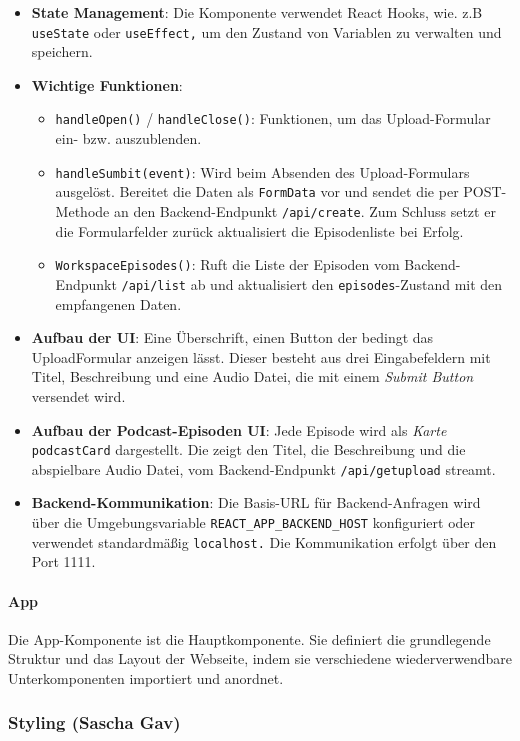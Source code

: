 \documentclass{article}
\begin{document}
\begin{itemize}
  \item \textbf{State Management}: Die Komponente verwendet React Hooks, wie. z.B \texttt{useState} oder \texttt{useEffect,} um den Zustand von Variablen zu verwalten und speichern.
  \item \textbf{Wichtige Funktionen}:
  \begin{itemize}
    \item \texttt{handleOpen()} / \texttt{handleClose()}: Funktionen, um das Upload-Formular ein- bzw. auszublenden.
    \item \texttt{handleSumbit(event)}: Wird beim Absenden des Upload-Formulars ausgelöst. Bereitet die Daten als \texttt{FormData} vor und sendet die per POST-Methode an den Backend-Endpunkt \texttt{/api/create}. Zum Schluss setzt er die Formularfelder zurück aktualisiert die Episodenliste bei Erfolg.
    \item \texttt{WorkspaceEpisodes()}: Ruft die Liste der Episoden vom Backend-Endpunkt \texttt{/api/list} ab und aktualisiert den \texttt{episodes}-Zustand mit den empfangenen Daten.
  \end{itemize}
\item \textbf{Aufbau der UI}: Eine Überschrift, einen Button der bedingt das UploadFormular anzeigen lässt. Dieser besteht aus drei Eingabefeldern mit Titel, Beschreibung und eine Audio Datei, die mit einem \textit{Submit Button} versendet wird.
\item \textbf{Aufbau der Podcast-Episoden UI}: Jede Episode wird als \textit{Karte} \texttt{podcastCard} dargestellt. Die zeigt den Titel, die Beschreibung und die abspielbare Audio Datei, vom Backend-Endpunkt \texttt{/api/getupload} streamt.
\item \textbf{Backend-Kommunikation}: Die Basis-URL für Backend-Anfragen wird über die Umgebungsvariable \texttt{REACT\_APP\_BACKEND\_HOST} konfiguriert oder verwendet standardmäßig \texttt{localhost.} Die Kommunikation erfolgt über den Port 1111.
\end{itemize}

\paragraph{App}
Die App-Komponente ist die Hauptkomponente. Sie definiert die grundlegende Struktur und das Layout der Webseite, indem sie verschiedene wiederverwendbare Unterkomponenten importiert und anordnet.

\subsubsection{Styling \small{(Sascha Gav)}}
\end{document}
